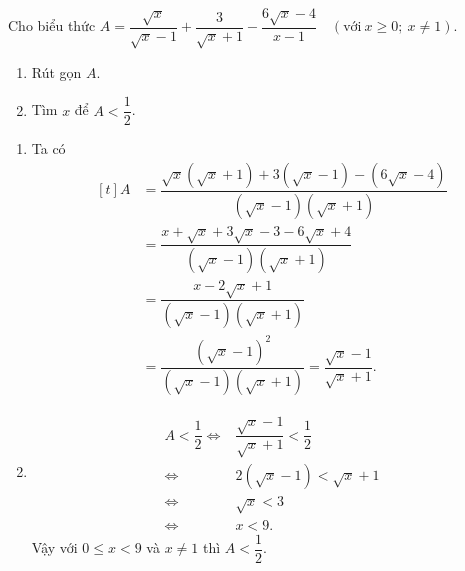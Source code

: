 \begin{bt}%
	Cho biểu thức $A =\dfrac{\sqrt{x}}{\sqrt{x} - 1} + \dfrac{3}{\sqrt{x} + 1} - \dfrac{6\sqrt{x} - 4}{x - 1}\quad(\text{với}\ x\geq 0;\ x\neq 1)$.
	\begin{enumerate}[1)]
		\item Rút gọn $A$.
		\item Tìm $x$ để $A < \dfrac{1}{2}$.
	\end{enumerate}
	\loigiai
	{ 
	\begin{enumerate}[1)]
		\item \allowdisplaybreaks
		Ta có 
		$$\begin{aligned}[t]
			A& =  \dfrac{\sqrt{x}(\sqrt{x} + 1) + 3(\sqrt{x} - 1) - (6\sqrt{x} - 4)}{(\sqrt{x} - 1)(\sqrt{x} + 1)}\\
			 & =  \dfrac{x + \sqrt{x} + 3\sqrt{x} - 3 - 6\sqrt{x} + 4}{(\sqrt{x} - 1)(\sqrt{x} + 1)}	\\
			 & = \dfrac{x - 2\sqrt{x} + 1}{(\sqrt{x} - 1)(\sqrt{x} + 1)} \\
			  & = \dfrac{\left(\sqrt{x} - 1  \right)^2}{(\sqrt{x} - 1)(\sqrt{x} + 1)} = \dfrac{\sqrt{x} - 1}{\sqrt{x} + 1}.
			  \end{aligned}$$
		\item 	\allowdisplaybreaks
		\begin{eqnarray*}
		A < \dfrac{1}{2} \Leftrightarrow & \dfrac{\sqrt{x} - 1}{\sqrt{x} + 1} < \dfrac{1}{2} \\
		\Leftrightarrow & 2(\sqrt{x} - 1) < \sqrt{x} + 1 \\
	    \Leftrightarrow &  \sqrt{x} < 3\\
		\Leftrightarrow &  x < 9.
			\end{eqnarray*}
		Vậy với $ 0 \leq x < 9$ và $x \neq 1$ thì $A < \dfrac{1}{2}$.
	\end{enumerate}	
		
		
	}
\end{bt}

